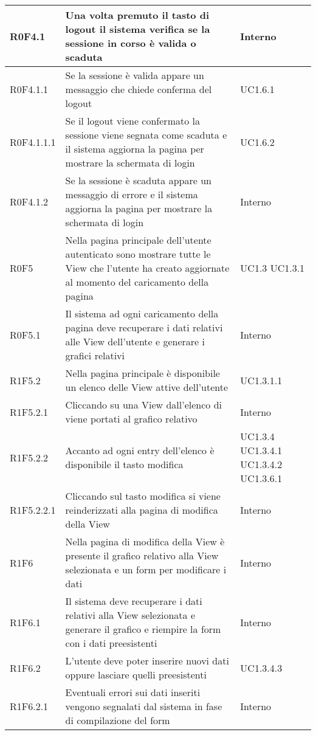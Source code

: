 \begin{center}
\begin{longtable}{| p{2cm} | p{8cm} | p{2cm} |}
		\hline
		R0F4.1  &  Una volta premuto il tasto di logout il sistema verifica se la sessione in corso è valida o scaduta  &  Interno \\
		\hline
		R0F4.1.1  &  Se la sessione è valida appare un messaggio che chiede conferma del logout  &  UC1.6.1 \\
		\hline
		R0F4.1.1.1  &  Se il logout viene confermato la sessione viene segnata come scaduta e il sistema aggiorna la pagina per mostrare la schermata di login  &  UC1.6.2 \\
		\hline
		R0F4.1.2  &  Se la sessione è scaduta appare un messaggio di errore e il sistema aggiorna la pagina per mostrare la schermata di login  &  Interno \\
		\hline
		R0F5  &  Nella pagina principale dell'utente autenticato sono mostrare tutte le View che l'utente ha creato aggiornate al momento del caricamento della pagina &  UC1.3 \newline UC1.3.1 \\
		\hline
		R0F5.1  &  Il sistema ad ogni caricamento della pagina deve recuperare i dati relativi alle View dell'utente e generare i grafici relativi  &  Interno \\
		\hline
		R1F5.2  &  Nella pagina principale è disponibile un elenco delle View attive dell'utente  &  UC1.3.1.1 \\
		\hline
		R1F5.2.1  &  Cliccando su una View dall'elenco di viene portati al grafico relativo  &  Interno \\
		\hline
		R1F5.2.2  &  Accanto ad ogni entry dell'elenco è disponibile il tasto modifica  &  UC1.3.4 \newline UC1.3.4.1 \newline UC1.3.4.2 \newline UC1.3.6.1 \\
		\hline
		R1F5.2.2.1  &  Cliccando sul tasto modifica si viene reinderizzati alla pagina di modifica della View  &  Interno \\
		\hline
		R1F6  &  Nella pagina di modifica della View è presente il grafico relativo alla View selezionata e un form per modificare i dati  &  Interno \\
		\hline
		R1F6.1  &  Il sistema deve recuperare i dati relativi alla View selezionata e generare il grafico e riempire la form con i dati preesistenti  &  Interno \\
		\hline
		R1F6.2  &  L'utente deve poter inserire nuovi dati oppure lasciare quelli preesistenti  &  UC1.3.4.3 \\
		\hline
		R1F6.2.1  &  Eventuali errori sui dati inseriti vengono segnalati dal sistema in fase di compilazione del form  &  Interno \\

\end{longtable}
\end{center}

